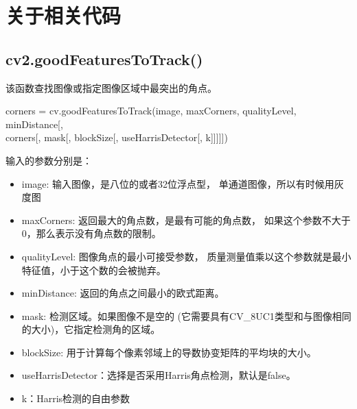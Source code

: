 \documentclass[AutoFakeBold]{MyFormat}
\begin{document}
\chapter{关于相关代码}

\section{cv2.goodFeaturesToTrack()}

\par 该函数查找图像或指定图像区域中最突出的角点。
\par corners = cv.goodFeaturesToTrack(image, maxCorners, 
qualityLevel, minDistance[,\\ corners[, mask[,
blockSize[, useHarrisDetector[, k]]]]])
\par 输入的参数分别是：
\begin{itemize}
    \item image: 输入图像，是八位的或者32位浮点型，
    单通道图像，所以有时候用灰度图
    \item maxCorners: 返回最大的角点数，是最有可能的角点数，
    如果这个参数不大于0，那么表示没有角点数的限制。
    \item qualityLevel: 图像角点的最小可接受参数，
    质量测量值乘以这个参数就是最小特征值，小于这个数的会被抛弃。
    \item minDistance: 返回的角点之间最小的欧式距离。
    \item mask: 检测区域。如果图像不是空的
    (它需要具有CV\_8UC1类型和与图像相同的大小)，它指定检测角的区域。
    \item blockSize: 用于计算每个像素邻域上的导数协变矩阵的平均块的大小。
    \item useHarrisDetector：选择是否采用Harris角点检测，默认是false。
    \item k：Harris检测的自由参数
\end{itemize}
\end{document}
